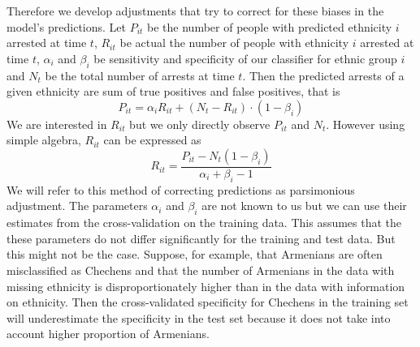 Therefore we develop adjustments that try to correct for these biases in the model's predictions. Let $P_{it}$ be the number of people with predicted ethnicity $i$ arrested at time $t$, $R_{it}$ be actual the number of people with ethnicity $i$ arrested at time $t$, $\alpha_i$ and $\beta_i$  be sensitivity and specificity of our classifier for ethnic group $i$ and $N_t$ be the total number of arrests at time $t$. Then the predicted arrests of a given ethnicity are sum of true positives and false positives, that is
\begin{equation}
    P_{it} = \alpha_i R_{it} + \left( N_t - R_{it} \right) \cdot \left(1 - \beta_i \right)  
\end{equation}
We are interested in $R_{it}$ but we only directly observe $P_{it}$ and $N_t$. However using simple algebra, $R_{it}$ can be expressed as
\begin{equation} \label{eq:pars_adj}
 R_{it} = \frac{P_{it} - N_t  \left(1 - \beta_i \right)}{\alpha_i + \beta_i - 1}
\end{equation}
We will refer to this method of correcting predictions as parsimonious adjustment.  The parameters $\alpha_i$ and $\beta_i$ are not known to us but we can use their estimates from the cross-validation on the training data. This assumes that the these parameters do not differ significantly for the training and test data. But this might not be the case. 
Suppose, for example, that Armenians are often misclassified as Chechens and that the number of Armenians in the data with missing ethnicity  is disproportionately higher than in the data with information on ethnicity. 
Then the cross-validated specificity for Chechens in the training set will underestimate the specificity in the test set because it does not take into account higher proportion of Armenians. 

